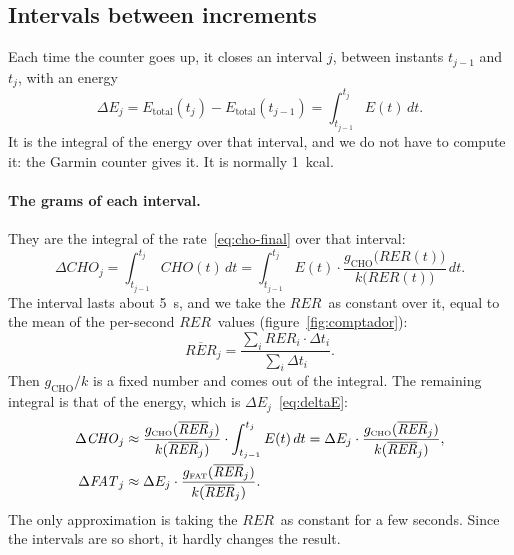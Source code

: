 \documentclass[10pt,a4paper]{article}
\newcommand{\sub}[1]{{\scriptscriptstyle\mathrm{#1}}}   %
\newcommand{\CHO}{\sub{CHO}}
\newcommand{\FAT}{\sub{FAT}}
\newcommand{\tot}{\sub{total}}
\newcommand{\cho}{\ensuremath{\mathit{CHO}}}               %
\newcommand{\fat}{\ensuremath{\mathit{FAT}}}
\newcommand{\RER}{\ensuremath{\mathit{RER}}}
\newcommand{\RERi}{\ensuremath{\overline{\mathit{RER}}}}
\begin{document}
\subsection{Intervals between increments}
Each time the counter goes up, it closes an interval $j$, between instants $t_{j-1}$ and
$t_j$, with an energy
\begin{equation}
  \Delta E_j=E_{\tot}(t_j)-E_{\tot}(t_{j-1})=\int_{t_{j-1}}^{t_j}E(t)\,dt .
  \label{eq:deltaE}
\end{equation}
It is the integral of the energy over that interval, and we do not have to compute it: the
Garmin counter gives it. It is normally 1~kcal.

\paragraph{The grams of each interval.} They are the integral of the
rate~\eqref{eq:cho-final} over that interval:
\[
  \Delta\cho_j=\int_{t_{j-1}}^{t_j}\cho(t)\,dt
  =\int_{t_{j-1}}^{t_j}E(t)\cdot\frac{g_{\CHO}\bigl(\RER(t)\bigr)}{k\bigl(\RER(t)\bigr)}\,dt .
\]
The interval lasts about 5~s, and we take the \RER\ as constant over it, equal to the mean
of the per-second \RER\ values (figure~\ref{fig:comptador}):
\[
  \RERi_j=\frac{\sum_i\RER_i\cdot\Delta t_i}{\sum_i\Delta t_i} .
\]
Then $g_{\CHO}/k$ is a fixed number and comes out of the integral. The remaining integral
is that of the energy, which is $\Delta E_j$~\eqref{eq:deltaE}:
\begin{align}
  \Delta\cho_j &\approx\frac{g_{\CHO}(\RERi_j)}{k(\RERi_j)}\cdot\int_{t_{j-1}}^{t_j}E(t)\,dt
  =\Delta E_j\cdot\frac{g_{\CHO}(\RERi_j)}{k(\RERi_j)}, \label{eq:interval}\\
  \Delta\fat_j &\approx\Delta E_j\cdot\frac{g_{\FAT}(\RERi_j)}{k(\RERi_j)} . \notag
\end{align}
The only approximation is taking the \RER\ as constant for a few seconds. Since the
intervals are so short, it hardly changes the result.
\end{document}
